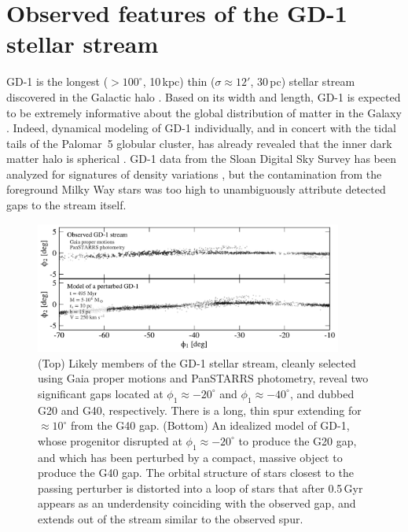 \documentclass[twocolumn]{aastex62}
\begin{document}
\section{Observed features of the GD-1 stellar stream}
\label{sec:data}
GD-1 is the longest ($>100^\circ$, 10\,kpc) thin ($\sigma\approx12'$, 30\,pc) stellar stream discovered in the Galactic halo \citep{gd2006}.
Based on its width and length, GD-1 is expected to be extremely informative about the global distribution of matter in the Galaxy \citep{lux2013, bh2018}.
Indeed, dynamical modeling of GD-1 individually, and in concert with the tidal tails of the Palomar~5 globular cluster, has already revealed that the inner dark matter halo is spherical \citep{koposov2010, bowden2015, bovy2016}.
GD-1 data from the Sloan Digital Sky Survey \citep[SDSS,][]{york2000} has been analyzed for signatures of density variations \citep{cg2013}, but the contamination from the foreground Milky Way stars was too high to unambiguously attribute detected gaps to the stream itself.

\begin{figure}
\begin{center}
\includegraphics[width=0.9\textwidth]{stream_encounter.pdf}
\end{center}
\caption{(Top) Likely members of the GD-1 stellar stream, cleanly selected using Gaia proper motions and PanSTARRS photometry, reveal two significant gaps located at $\phi_1\approx-20^\circ$ and $\phi_1\approx-40^\circ$, and dubbed G20 and G40, respectively.
There is a long, thin spur extending for $\approx10^\circ$ from the G40 gap.
(Bottom) An idealized model of GD-1, whose progenitor disrupted at $\phi_1\approx-20^\circ$ to produce the G20 gap, and which has been perturbed by a compact, massive object to produce the G40 gap.
The orbital structure of stars closest to the passing perturber is distorted into a loop of stars that after 0.5\,Gyr appears as an underdensity coinciding with the observed gap, and extends out of the stream similar to the observed spur.
}
\label{fig:fiducial}
\end{figure}
\end{document}
